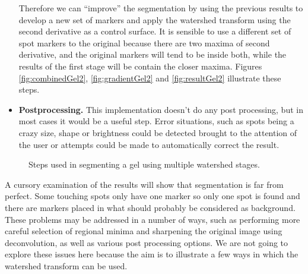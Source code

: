 \documentclass{InsightArticle}
\begin{document}
\begin{itemize}
Therefore we can ``improve'' the segmentation by using the previous
results to develop a new set of markers and apply the watershed
transform using the second derivative as a control surface. It is
sensible to use a different set of spot markers to the original
because there are two maxima of second derivative, and the original
markers will tend to be inside both, while the results of the first
stage will be contain the closer maxima. Figures
\ref{fig:combinedGel2}, \ref{fig:gradientGel2} and \ref{fig:resultGel2}
illustrate these steps.

\item {\bf Postprocessing.} This implementation doesn't do any post 
processing, but in most cases it would be a useful step. Error
situations, such as spots being a crazy size, shape or brightness
could be detected brought to the attention of the user or attempts
could be made to automatically correct the result.
\end{itemize}
\begin{figure}[htbp]
\begin{center}


\caption{Steps used in segmenting a gel using multiple watershed stages.}
\end{center}
\end{figure}

A cursory examination of the results will show that segmentation is
far from perfect. Some touching spots only have one marker so only one
spot is found and there are markers placed in what should probably be
considered as background. These problems may be addressed in a number
of ways, such as performing more careful selection of regional minima
and sharpening the original image using deconvolution, as well as
various post processing options. We are not going to explore these
issues here because the aim is to illustrate a few ways in which the
watershed transform can be used.
\end{document}
